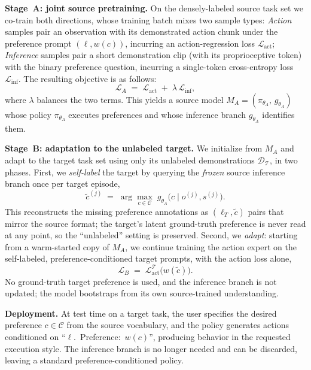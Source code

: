 \documentclass{article}
\begin{document}
\textbf{Stage~A: joint source pretraining.}
On the densely-labeled source task set we co-train both directions, whose training batch mixes two sample types:
\emph{Action} samples pair an observation with its demonstrated action chunk under the preference prompt $(\ell, w(c))$, incurring an action-regression loss $\mathcal{L}_{\mathrm{act}}$;
\emph{Inference} samples pair a short demonstration clip (with its proprioceptive token) with the binary preference question, incurring a single-token cross-entropy loss $\mathcal{L}_{\mathrm{inf}}$.
The resulting objective is as follows:
\begin{equation}
  \mathcal{L}_{A} \;=\; \mathcal{L}_{\mathrm{act}} \;+\; \lambda\,\mathcal{L}_{\mathrm{inf}},
  \label{eq:stageA}
\end{equation}
where $\lambda$ balances the two terms. This yields a source model $M_A=(\pi_{\theta_A},\,g_{\theta_A})$ whose policy $\pi_{\theta_A}$ executes preferences and whose inference branch $g_{\theta_A}$ identifies them.

\textbf{Stage~B: adaptation to the unlabeled target.}
We initialize from $M_A$ and adapt to the target task set using only its unlabeled demonstrations $\mathcal{D}_{\mathcal{T}}$, in two phases.
First, we \emph{self-label} the target by querying the \emph{frozen} source inference branch once per target episode,
\begin{equation}
  \tilde{c}^{(j)} \;=\; \arg\max_{c\in\mathcal{C}}\; g_{\theta_A}\!\big(c \mid o^{(j)},s^{(j)}\big).
  \label{eq:pseudolabel}
\end{equation}
This reconstructs the missing preference annotations as $(\ell_T,\tilde{c})$ pairs
that mirror the source format; the target's latent ground-truth preference is
never read at any point, so the ``unlabeled'' setting is preserved.
Second, we \emph{adapt}: starting from a warm-started copy of $M_A$, we continue
training the action expert on the self-labeled, preference-conditioned target
prompts, with the action loss alone,
\begin{equation}
  \mathcal{L}_{B} \;=\; \mathcal{L}^{\mathcal{T}}_{\mathrm{act}}\!\big(w(\tilde{c})\big).
  \label{eq:stageB}
\end{equation}
No ground-truth target preference is used, and the inference branch is not
  updated; the model bootstraps from its own source-trained understanding.

\textbf{Deployment.}
At test time on a target task, the user specifies the desired preference
$c\in\mathcal{C}$ from the source vocabulary, and the policy generates actions
conditioned on ``$\ell$.~Preference:~$w(c)$'', producing behavior in the
requested execution style. The inference branch is no longer needed and can be
discarded, leaving a standard preference-conditioned policy.
\end{document}
